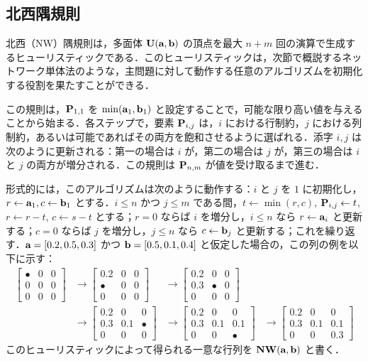 \subsection{北西隅規則}\label{subsec-northwest}
北西（NW）隅規則は，多面体 $\CouplingsD(\a,\b)$ の頂点を最大 $n+m$ 回の演算で生成するヒューリスティックである．このヒューリスティックは，次節で概説するネットワーク単体法のような，主問題に対して動作する任意のアルゴリズムを初期化する役割を果たすことができる．

この規則は，$\P_{1,1}$ を $\min(\a_1,\b_1)$ と設定することで，可能な限り高い値を与えることから始まる．各ステップで，要素 $\P_{i,j}$ は，$i$ における行制約，$j$ における列制約，あるいは可能であればその両方を飽和させるように選ばれる．添字 $i,j$ は次のように更新される：第一の場合は $i$ が，第二の場合は $j$ が，第三の場合は $i$ と $j$ の両方が増分される．この規則は $\P_{n,m}$ が値を受け取るまで進む．

形式的には，このアルゴリズムは次のように動作する：$i$ と $j$ を $1$ に初期化し，$r\leftarrow\a_1,c\leftarrow \b_1$ とする．$i\leq n$ かつ $j\leq m$ である間，$t\leftarrow \min(r,c)$, $\P_{i,j}\leftarrow t$, $r\leftarrow r-t$, $c\leftarrow s-t$ とする；$r=0$ ならば $i$ を増分し，$i\leq n$ なら $r\leftarrow\a_i$ と更新する；$c=0$ ならば $j$ を増分し，$j\leq n$ なら $c\leftarrow \b_j$ と更新する；これを繰り返す．$\a=[0.2,0.5,0.3]$ かつ $\b=[0.5,0.1,0.4]$ と仮定した場合の，この列の例を以下に示す：
$$\begin{aligned}\begin{bmatrix} \bullet & 0 & 0 \\ 0 & 0 & 0 \\ 0& 0 & 0\end{bmatrix} &\rightarrow \begin{bmatrix} 0.2 & 0 & 0 \\ \bullet & 0 & 0 \\ 0& 0 & 0\end{bmatrix} &\rightarrow \begin{bmatrix} 0.2 & 0 & 0 \\ 0.3 & \bullet & 0 \\ 0& 0 & 0\end{bmatrix}\\ &\rightarrow \begin{bmatrix} 0.2 & 0 & 0 \\ 0.3 &0.1 &\bullet \\ 0& 0 & 0\end{bmatrix} &\rightarrow \begin{bmatrix} 0.2 & 0 & 0 \\ 0.3 &0.1 &0.1 \\ 0& 0 & \bullet\end{bmatrix} & \rightarrow \begin{bmatrix} 0.2 & 0 & 0 \\ 0.3 &0.1 &0.1 \\ 0& 0 & 0.3\end{bmatrix}\end{aligned}$$
このヒューリスティックによって得られる一意な行列を $\NW(\a,\b)$ と書く．

